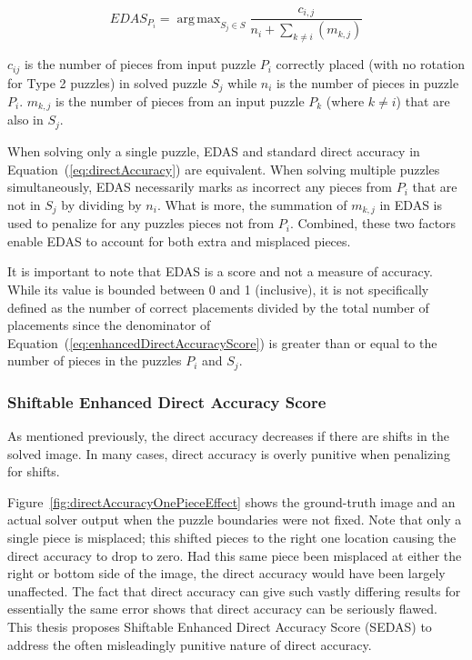 \documentclass{report}
\def\eref#1{(\ref{#1})}
\DeclareMathOperator*{\argmax}{arg\,max} %
\begin{document}
\begin{equation} \label{eq:enhancedDirectAccuracyScore}
EDAS_{P_i} = \argmax_{S_j \in S}\frac{c_{i,j}}{n_i + \sum_{k \ne i}(m_{k,j})}
\end{equation}

\noindent
$c_{ij}$ is the number of pieces from input puzzle $P_i$ correctly placed (with no rotation for Type 2 puzzles) in solved puzzle $S_j$ while $n_i$ is the number of pieces in puzzle $P_i$. $m_{k,j}$ is the number of pieces from an input puzzle $P_k$ (where $k \ne i$) that are also in $S_j$.

When solving only a single puzzle, EDAS and standard direct accuracy in Equation~\eref{eq:directAccuracy} are equivalent.  When solving multiple puzzles simultaneously, EDAS necessarily marks as incorrect any pieces from $P_i$ that are not in $S_j$ by dividing by $n_i$.  What is more, the summation of $m_{k,j}$ in EDAS is used to penalize for any puzzles pieces not from $P_i$.  Combined, these two factors enable EDAS to account for both extra and misplaced pieces.

It is important to note that EDAS is a score and not a measure of accuracy. While its value is bounded between 0 and 1 (inclusive), it is not specifically defined as the number of correct placements divided by the total number of placements since the denominator of Equation~\eref{eq:enhancedDirectAccuracyScore} is greater than or equal to the number of pieces in the puzzles $P_i$ and $S_j$.

\subsubsection{Shiftable Enhanced Direct Accuracy Score}\label{sec:shiftableEnhancedDirectAccuracy}

As mentioned previously, the direct accuracy decreases if there are shifts in the solved image.  In many cases, direct accuracy is overly punitive when penalizing for shifts. 

Figure~\ref{fig:directAccuracyOnePieceEffect} shows the ground-truth image and an actual solver output when the puzzle boundaries were not fixed.  Note that only a single piece is misplaced; this shifted pieces to the right one location causing the direct accuracy to drop to zero.  Had this same piece been misplaced at either the right or bottom side of the image, the direct accuracy would have been largely unaffected.  The fact that direct accuracy can give such vastly differing results for essentially the same error shows that direct accuracy can be seriously flawed.  This thesis proposes Shiftable Enhanced Direct Accuracy Score (SEDAS) to address the often misleadingly punitive nature of direct accuracy. 
\end{document}
